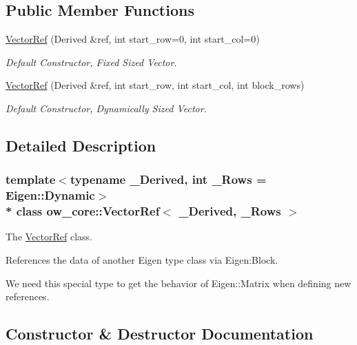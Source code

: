 \subsection*{Public Member Functions}
\begin{DoxyCompactItemize}
\item 
\hyperlink{classow__core_1_1VectorRef_ad88b333ead4d1543c04f77c995442f2e}{Vector\+Ref} (Derived \&ref, int start\+\_\+row=0, int start\+\_\+col=0)
\begin{DoxyCompactList}\small\item\em Default Constructor, Fixed Sized Vector. \end{DoxyCompactList}\item 
\hyperlink{classow__core_1_1VectorRef_a9b1ea302b7d5ecc22a44816068f03e00}{Vector\+Ref} (Derived \&ref, int start\+\_\+row, int start\+\_\+col, int block\+\_\+rows)
\begin{DoxyCompactList}\small\item\em Default Constructor, Dynamically Sized Vector. \end{DoxyCompactList}\end{DoxyCompactItemize}


\subsection{Detailed Description}
\subsubsection*{template$<$typename \+\_\+\+Derived, int \+\_\+\+Rows = Eigen\+::\+Dynamic$>$\\*
class ow\+\_\+core\+::\+Vector\+Ref$<$ \+\_\+\+Derived, \+\_\+\+Rows $>$}

The \hyperlink{classow__core_1_1VectorRef}{Vector\+Ref} class. 

References the data of another Eigen type class via Eigen\+:Block.

We need this special type to get the behavior of Eigen\+::\+Matrix when defining new references. 

\subsection{Constructor \& Destructor Documentation}
